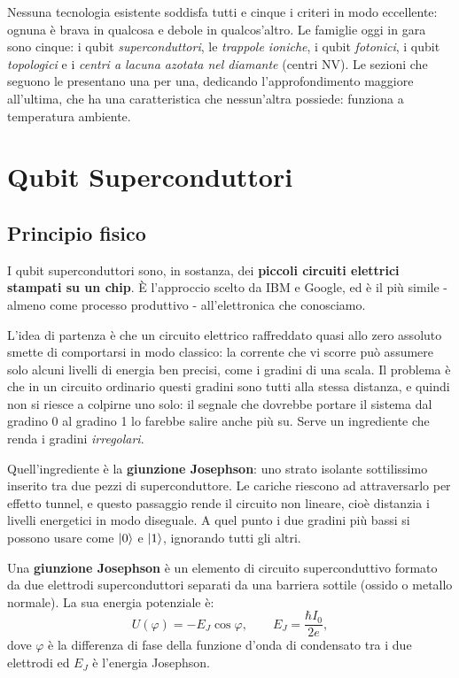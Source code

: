Nessuna tecnologia esistente soddisfa tutti e cinque i criteri in modo
eccellente: ognuna è brava in qualcosa e debole in qualcos'altro. Le famiglie
oggi in gara sono cinque: i qubit \textit{superconduttori}, le \textit{trappole
ioniche}, i qubit \textit{fotonici}, i qubit \textit{topologici} e i
\textit{centri a lacuna azotata nel diamante} (centri NV). Le sezioni che
seguono le presentano una per una, dedicando l'approfondimento maggiore
all'ultima, che ha una caratteristica che nessun'altra possiede: funziona a
temperatura ambiente.

\section{Qubit Superconduttori}
\label{sec:supercond}

\subsection{Principio fisico}
\label{subsec:sc-principio}

I qubit superconduttori sono, in sostanza, dei \textbf{piccoli circuiti
elettrici stampati su un chip}. È l'approccio scelto da IBM e Google, ed è il
più simile - almeno come processo produttivo - all'elettronica che conosciamo.

L'idea di partenza è che un circuito elettrico raffreddato quasi allo zero
assoluto smette di comportarsi in modo classico: la corrente che vi scorre
può assumere solo alcuni livelli di energia ben precisi, come i gradini di una
scala. Il problema è che in un circuito ordinario questi gradini sono tutti
alla stessa distanza, e quindi non si riesce a colpirne uno solo: il segnale
che dovrebbe portare il sistema dal gradino 0 al gradino 1 lo farebbe salire
anche più su. Serve un ingrediente che renda i gradini \textit{irregolari}.

Quell'ingrediente è la \textbf{giunzione Josephson}: uno strato isolante
sottilissimo inserito tra due pezzi di superconduttore. Le cariche riescono ad
attraversarlo per effetto tunnel, e questo passaggio rende il circuito non
lineare, cioè distanzia i livelli energetici in modo diseguale. A quel punto
i due gradini più bassi si possono usare come $\ket{0}$ e $\ket{1}$, ignorando
tutti gli altri.

\begin{definizione}
  Una \textbf{giunzione Josephson} è un elemento di circuito superconduttivo
  formato da due elettrodi superconduttori separati da una barriera sottile
  (ossido o metallo normale). La sua energia potenziale è:
  \begin{equation}
    U(\varphi) = -E_J \cos\varphi, \qquad E_J = \frac{\hbar I_0}{2e},
  \end{equation}
  dove $\varphi$ è la differenza di fase della funzione d'onda di condensato
  tra i due elettrodi ed $E_J$ è l'energia Josephson.
\end{definizione}

